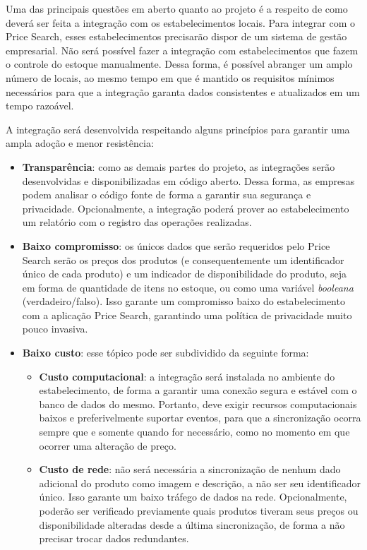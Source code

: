 Uma das principais questões em aberto quanto ao projeto é a respeito de como deverá ser feita a integração com os estabelecimentos locais. Para integrar com o Price Search, esses estabelecimentos precisarão dispor de um sistema de gestão empresarial. Não será possível fazer a integração com estabelecimentos que fazem o controle do estoque manualmente. Dessa forma, é possível abranger um amplo número de locais, ao mesmo tempo em que é mantido os requisitos mínimos necessários para que a integração garanta dados consistentes e atualizados em um tempo razoável.

A integração será desenvolvida respeitando alguns princípios para garantir uma ampla adoção e menor resistência:
\begin{itemize}
    \item \textbf{Transparência}: como as demais partes do projeto, as integrações serão desenvolvidas e disponibilizadas em código aberto. Dessa forma, as empresas podem analisar o código fonte de forma a garantir sua segurança e privacidade. Opcionalmente, a integração poderá prover ao estabelecimento um relatório com o registro das operações realizadas.
    \item \textbf{Baixo compromisso}: os únicos dados que serão requeridos pelo Price Search serão os preços dos produtos (e consequentemente um identificador único de cada produto) e um indicador de disponibilidade do produto, seja em forma de quantidade de itens no estoque, ou como uma variável \textit{booleana} (verdadeiro/falso). Isso garante um compromisso baixo do estabelecimento com a aplicação Price Search, garantindo uma política de privacidade muito pouco invasiva.
    \item \textbf{Baixo custo}: esse tópico pode ser subdividido da seguinte forma:
    \begin{itemize}
        \item \textbf{Custo computacional}: a integração será instalada no ambiente do estabelecimento, de forma a garantir uma conexão segura e estável com o banco de dados do mesmo. Portanto, deve exigir recursos computacionais baixos e preferivelmente suportar eventos, para que a sincronização ocorra sempre que e somente quando for necessário, como no momento em que ocorrer uma alteração de preço.
        \item \textbf{Custo de rede}: não será necessária a sincronização de nenhum dado adicional do produto como imagem e descrição, a não ser seu identificador único. Isso garante um baixo tráfego de dados na rede. Opcionalmente, poderão ser verificado previamente quais produtos tiveram seus preços ou disponibilidade alteradas desde a última sincronização, de forma a não precisar trocar dados redundantes.

\end{itemize}
\end{itemize}

